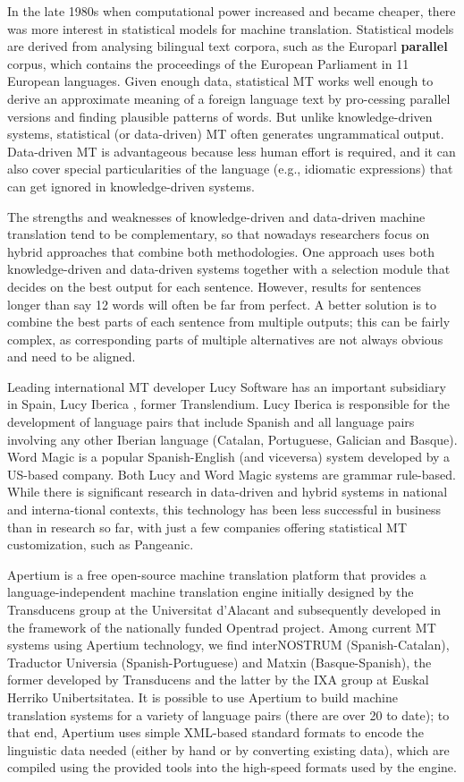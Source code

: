 \begin{multicols}{2}
In the late 1980s when computational power increased and became cheaper, there was more interest in statistical models for machine translation. Statistical models are derived from analysing bilingual text corpora, such as the Europarl \textbf{parallel} corpus, which contains the proceedings of the European Parliament in 11 European languages. Given enough data, statistical MT works well enough to derive an approximate meaning of a foreign language text by pro-cessing parallel versions and finding plausible patterns of words. But unlike knowledge-driven systems, statistical (or data-driven) MT often generates ungrammatical output. Data-driven MT is advantageous because less human effort is required, and it can also cover special particularities of the language (e.g., idiomatic expressions) that can get ignored in knowledge-driven systems.

The strengths and weaknesses of knowledge-driven and data-driven machine translation tend to be complementary, so that nowadays researchers focus on hybrid approaches that combine both methodologies. One approach uses both knowledge-driven and data-driven systems together with a selection module that decides on the best output for each sentence. However, results for sentences longer than say 12 words will often be far from perfect. A better solution is to combine the best parts of each sentence from multiple outputs; this can be fairly complex, as corresponding parts of multiple alternatives are not always obvious and need to be aligned. 

Leading international MT developer Lucy Software has an important subsidiary in Spain, Lucy Iberica , former Translendium. Lucy Iberica is responsible for the development of language pairs that include Spanish and all language pairs involving any other Iberian language (Catalan, Portuguese, Galician and Basque). Word Magic is a popular Spanish-English (and viceversa) system developed by a US-based company. Both Lucy and Word Magic systems are grammar rule-based. While there is significant research in data-driven and hybrid systems in national and interna-tional contexts, this technology has been less successful in business than in research so far, with just a few companies offering statistical MT customization, such as Pangeanic. 

Apertium is a free open-source machine translation platform that provides a language-independent machine translation engine initially designed by the Transducens group at the Universitat d'Alacant and subsequently developed in the framework of  the nationally funded Opentrad project. Among current MT systems using Apertium technology, we find interNOSTRUM (Spanish-Catalan), Traductor Universia (Spanish-Portuguese) and Matxin (Basque-Spanish), the former developed by Transducens and the latter by the IXA group  at Euskal Herriko Unibertsitatea. It is possible to use Apertium to build machine translation systems for a variety of language pairs (there are over 20 to date); to that end, Apertium uses simple XML-based standard formats to encode the linguistic data needed (either by hand or by converting existing data), which are compiled using the provided tools into the high-speed formats used by the engine.


\end{multicols}
